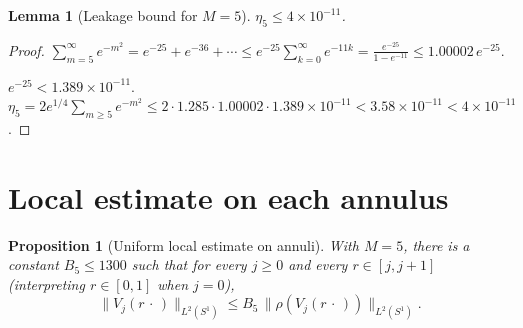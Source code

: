 \documentclass[11pt]{article}
\newtheorem{proposition}[theorem]{Proposition}
\newtheorem{lemma}[theorem]{Lemma}
\newcommand{\rhof}{\rho}
\newcommand{\norm}[1]{\lVert #1\rVert}
\begin{document}
\begin{lemma}[Leakage bound for $M = 5$]\label{lem:eta5}
$\eta_5 \le 4\times 10^{-11}$.
\end{lemma}
\begin{proof}
$\sum_{m=5}^{\infty}e^{-m^2} = e^{-25}+e^{-36}+\cdots \le e^{-25}\sum_{k=0}^{\infty}e^{-11k}
= \frac{e^{-25}}{1-e^{-11}} \le 1.00002\,e^{-25}$.

$e^{-25} < 1.389\times 10^{-11}$.
$\eta_5 = 2e^{1/4}\sum_{m\ge 5}e^{-m^2} \le 2\cdot1.285\cdot1.00002\cdot1.389\times10^{-11}
< 3.58\times10^{-11} < 4\times10^{-11}$.
\end{proof}

\section{Local estimate on each annulus}\label{sec:annulus-local}

\begin{proposition}[Uniform local estimate on annuli]\label{prop:annulus}
With $M = 5$, there is a constant $B_5 \le 1300$ such that for every $j \ge 0$
and every $r \in [j,j+1]$ (interpreting $r \in [0,1]$ when $j = 0$),
\begin{equation}\label{eq:annulus-local}
  \norm{V_j(r\,\cdot\,)}_{L^2(S^1)} \le B_5\,\norm{\rhof(V_j(r\,\cdot\,))}_{L^2(S^1)}.
\end{equation}
\end{proposition}
\end{document}
